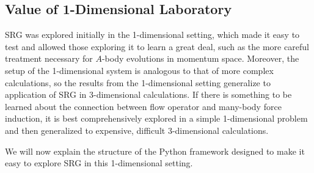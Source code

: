\subsection{Value of 1-Dimensional Laboratory}

SRG was explored initially in the 1-dimensional setting, which made it easy to test and allowed those exploring it to learn a great deal, such as the more careful treatment necessary for $A$-body evolutions in momentum space. Moreover, the setup of the 1-dimensional system is analogous to that of more complex calculations, so the results from the 1-dimensional setting generalize to application of SRG in 3-dimensional calculations. If there is something to be learned about the connection between flow operator and many-body force induction, it is best comprehensively explored in a simple 1-dimensional problem and then generalized to expensive, difficult 3-dimensional calculations.

We will now explain the structure of the Python framework designed to make it easy to explore SRG in this 1-dimensional setting.